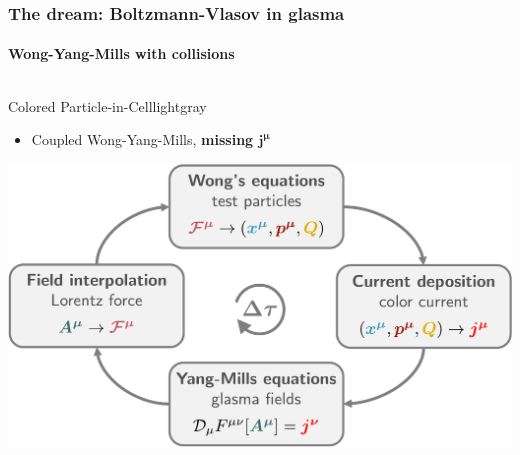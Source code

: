 \documentclass[aspectratio=169,11pt,usenames,dvipsnames]{beamer}
\begin{document}
\begin{frame}
    \frametitle{{\normalsize\color{jyured}\bfseries\sffamily The dream: }Boltzmann-Vlasov in glasma}
    \framesubtitle{Wong-Yang-Mills with collisions}
    \vspace{-20pt}
    \begin{center}
        \begin{columns}[onlytextwidth,t]
            \begin{center}
            \begin{custombox2}{\normalsize Colored Particle-in-Cell}{lightgray}
                \small
                \begin{varwidth}{0.85\textwidth}
                \begin{itemize}\itemsep0em 
                    \itemsep0em
                    \footnotesize
                    \item Coupled Wong-Yang-Mills, {\bfseries\color{jyured}missing $\boldsymbol{j^\mu}$}
                \end{itemize}
                \end{varwidth}
            \end{custombox2}

                \includegraphics[width=0.95\columnwidth]{images/cpic.pdf}
            \end{center}


\end{columns}
\end{center}
\end{frame}
\end{document}
